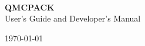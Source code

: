 
  \begin{center}
\HRule\\[0.5 cm]

{\huge \bfseries QMCPACK \\[0.5cm]}
{\large User's Guide and Developer's Manual\\[1cm]}

\HRule

\vfill

{\large \today}

  \end{center}
